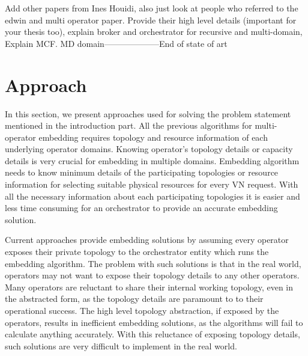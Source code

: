 \documentclass[article,dr=phil,type=msc ,colorback,accentcolor=tud4b]{tudthesis}
\begin{document}
Add other papers from Ines Houidi, also just look at people who referred to the edwin and multi operator paper. Provide their high level details (important for your thesis too), explain broker and orchestrator for recursive and multi-domain, Explain MCF. 
MD domain--------------------End of state of art



\newpage
\section{Approach}
In this section, we present approaches used for solving the problem statement mentioned in the introduction part. All the previous algorithms for multi-operator embedding requires topology and resource information of each underlying operator domains. Knowing operator's topology details or capacity details is very crucial for embedding in multiple domains. Embedding algorithm needs to know minimum details of the participating topologies or resource information for selecting suitable physical resources for every VN request. With all the necessary information about each participating topologies it is easier and less time consuming for an orchestrator to provide an accurate embedding solution. \newline

Current approaches provide embedding solutions by assuming every operator exposes their private topology to the orchestrator entity which runs the embedding algorithm. The problem with such solutions is that in the real world, operators may not want to expose their topology details to any other operators. Many operators are reluctant to share their internal working topology, even in the abstracted form, as the topology details are paramount to to their operational success. The high level topology abstraction, if exposed by the operators, results in inefficient embedding solutions, as the algorithms will fail to calculate anything accurately. With this reluctance of exposing topology details, such solutions are very difficult to implement in the real world.\newline  
\end{document}
